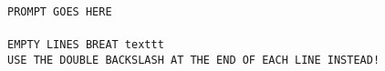 
\begin{tcolorbox}[breakable=true, colframe=teal, colback=white, title={
    TITLE GOES HERE
}, coltitle=white, center title, fonttitle=\bfseries]

\texttt{\\
PROMPT GOES HERE\\
\\
EMPTY LINES BREAT texttt\\
USE THE DOUBLE BACKSLASH AT THE END OF EACH LINE INSTEAD!\\
\\
}
\end{tcolorbox}
